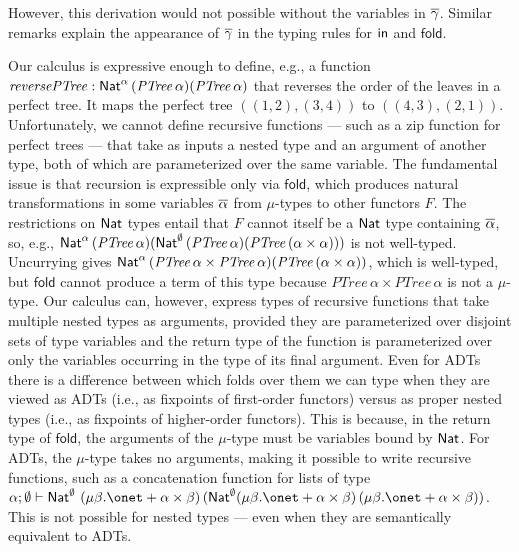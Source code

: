 \documentclass[runningheads]{llncs}
\begin{document}
\vspace*{0.1in}

\noindent
However, this derivation would not possible without the variables in
$\overline{\gamma}$.  Similar remarks explain the appearance of $\overline{\gamma}$
in the typing rules for $\mathsf{in}$ and $\mathsf{fold}$.


Our calculus is expressive enough to define, e.g., a function
$\mathit{reversePTree}: \mathsf{Nat}^\alpha \, (\mathit{PTree}\,\alpha)
(\mathit{PTree}\,\alpha)$ that reverses the order of the leaves in a
perfect tree. It maps the perfect tree $((1, 2), (3, 4))$ to $((4, 3),
(2, 1))$.  Unfortunately, we cannot define recursive functions ---
such as a zip function for perfect trees --- that take as inputs a
nested type and an argument of another type, both of which are
parameterized over the same variable. The fundamental issue is that
recursion is expressible only via $\mathsf{fold}$, which produces
natural transformations in some variables $\overline{\alpha}$ from
$\mu$-types to other functors $F$. The restrictions on $\mathsf{Nat}$ types
entail that $F$ cannot itself be a $\mathsf{Nat}$ type containing
$\overline{\alpha}$, so, e.g., $\mathsf{Nat}^\alpha \, (\mathit{PTree}\,\alpha)
(\mathsf{Nat}^\emptyset \, (\mathit{PTree}\,\alpha) (\mathit{PTree}\,(\alpha
\times \alpha)))$ is not well-typed.  Uncurrying gives $\mathsf{Nat}^\alpha \,
(\mathit{PTree}\,\alpha \times \mathit{PTree}\,\alpha)
(\mathit{PTree}\,(\alpha \times \alpha))$, which is well-typed, but
$\mathsf{fold}$ cannot produce a term of this type because
$\mathit{PTree}\,\alpha \times \mathit{PTree}\,\alpha$ is not a
$\mu$-type.  Our calculus can, however, express types of recursive
functions that take multiple nested types as arguments, provided they
are parameterized over disjoint sets of type variables and the return
type of the function is parameterized over only the variables
occurring in the type of its final argument.  Even for ADTs there is a
difference between which folds over them we can type when they are
viewed as ADTs (i.e., as fixpoints of first-order functors) versus as
proper nested types (i.e., as fixpoints of higher-order
functors). This is because, in the return type of $\mathsf{fold}$, the
arguments of the $\mu$-type must be variables bound by $\mathsf{Nat}$.  For
ADTs, the $\mu$-type takes no arguments, making it possible to write
recursive functions, such as a concatenation function for lists of
type $\alpha ; \emptyset \vdash \Nat^\emptyset \ (\mu \beta. \onet +
\alpha \times \beta)\, (\Nat^\emptyset (\mu \beta. \onet + \alpha
\times \beta) \, (\mu \beta. \onet + \alpha \times \beta))$.  This is
not possible for nested types --- even when they are semantically
equivalent to ADTs.
\end{document}
